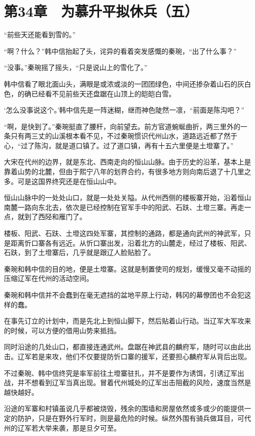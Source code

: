 \section{第34章　为慕升平拟休兵（五）}

“前些天还能看到雪的。”

“啊？什么？”韩中信抬起了头，诧异的看着突发感慨的秦琬，“出了什么事？”

“没事。”秦琬摇了摇头，“只是说山上的雪化了。”

韩中信看了眼北面山头，满眼是或浓或淡的一团团绿色，中间还掺杂着山石的灰白色，的确已经看不见前些天还盘踞在山顶上的皑皑白雪。

‘怎么没事说这个。’韩中信先是一阵迷糊，继而神色陡然一凛，“前面是陈沟吧？”

“啊，是快到了。”秦琬挺直了腰杆，向前望去。前方官道蜿蜒曲折，两三里外的一条只有两三丈的山溪根本看不见，不过秦琬惯识代州山水，道路远近都了然于心，“过了陈沟，就是道口镇了。过了道口镇，再有十五六里便是土墱寨了。”

大宋在代州的边界，就是东北、西南走向的恒山山脉。由于历史的沿革，基本上是靠着山势的北麓，但由于熙宁八年的划界合约，有很多地方则向南后退了十几里之多。可是这国界终究还是在恒山山中。

恒山山脉中的一处处山口，就是一处处关隘。从代州西侧的楼板寨开始，沿着恒山南麓一路向东北去，依次是已经控制在官军手中的阳武、石趺、土墱三寨。再走一点，就到了西陉和雁门了。

楼板、阳武、石趺、土墱这四处军寨，其控制的通路，都是通向武州的神武军，只是距离忻口寨各有远近。从忻口寨出发，沿着北方的山麓走，经过了楼板、阳武、石趺，到了土墱寨后，几乎就是跟辽人脸贴脸了。

秦琬和韩中信的目的地，便是土墱寨。这就是制置使司的规划，缓慢又毫不动摇的压缩辽军在代州的活动空间。

秦琬和韩中信并不会蠢到在毫无遮挡的盆地平原上行动，韩冈的幕僚团也不会犯这样的蠢。

在事先订立的计划中，而是先北上到恒山脚下，然后贴着山行动。当辽军大军攻来的时候，可以方便的借用山势来抵挡。

同时沿途的几处山口，都直接连通武州。盘踞在神武县的麟府军，随时可以由此出击。辽军若是来攻，他们不仅要提防忻口寨的援军，还要担心麟府军从背后出现。

不过秦琬、韩中信终究是率军前往土墱寨驻扎，并不是要作为诱饵，引诱辽军出战，并不想看到辽军当真出现。冒着代州城处的辽军出击阻截的风险，速度当然是越快越好。

沿途的军寨和村镇虽说几乎都被烧毁，残余的围墙和房屋依然或多或少的能提供一定的防护，只是在野外行军时，则是最危险的时候。纵然外围有骑兵做耳目，可代州的辽军若大举来袭，那是旦夕可至。


